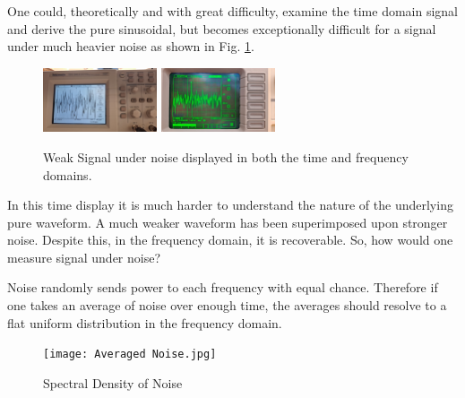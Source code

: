\documentclass[prl,twocolumn,superscriptaddress,floatfix]{revtex4}
\begin{document}
One could, theoretically and with great difficulty, examine the time domain signal and derive the pure sinusoidal, but
becomes exceptionally difficult for a signal under much heavier noise as shown in Fig. \ref{fig:2}. 

\begin{figure}[H]
    \begin{center}
    \includegraphics[width = 0.3\textwidth]{Time Data C.jpg}
    \includegraphics[width = 0.3\textwidth]{Signal C under Noise.jpg}
    \caption{\label{fig:2}Weak Signal under noise displayed in both the time and frequency domains.}
    \end{center}
\end{figure}

In this time display it is much harder to understand the nature of the underlying pure waveform.
A much weaker waveform has been superimposed upon stronger noise.
Despite this, in the frequency domain, it is recoverable. So, how would one measure signal under noise?

Noise randomly sends power to each frequency with equal chance.
Therefore if one takes an average of noise over enough time, the averages should resolve to a flat uniform distribution in the frequency domain.

 \begin{figure}[H]
    \centering
    \texttt{[image: Averaged Noise.jpg]}
    \caption{Spectral Density of Noise}
    \label{fig:fig 3}
 \end{figure}
\end{document}
